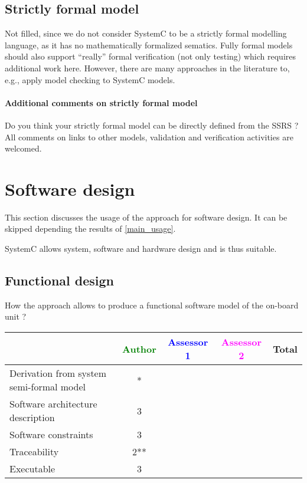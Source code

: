 \subsection{Strictly formal model}

\begin{author_comment}
Not filled, since we do not consider SystemC to be a strictly formal modelling language, as it has no mathematically formalized sematics. Fully formal models should also support ``really'' formal verification (not only testing) which requires additional work here. However, there are many approaches in the literature to, e.g., apply model checking to SystemC models.
\end{author_comment}


\paragraph{Additional comments on strictly formal  model} Do you think your strictly formal  model can be directly defined from the SSRS ?
All comments on links to  other models, validation and verification activities are welcomed.


\section{Software design}
This section discusses the usage of the approach for software design.
It can be skipped depending the results of \ref{main_usage}.

\begin{author_comment}
SystemC allows system, software and hardware design and is thus suitable.
\end{author_comment}

\subsection{Functional design}

How the approach allows to  produce a functional software model of the on-board unit ?

\begin{tabular}{|l | c | c | c | c|}
\hline
& \textcolor{green}{Author} & \textcolor{blue}{Assessor 1} & \textcolor{magenta}{Assessor 2} & Total \\
\hline
Derivation from system semi-formal model  &* & & &  \\
\hline 
Software architecture description  &3 & & &  \\
\hline
Software constraints  &3 & & &  \\
\hline
Traceability  &2** & & &  \\
\hline
Executable  &3 & & &  \\
\hline
\end{tabular}

